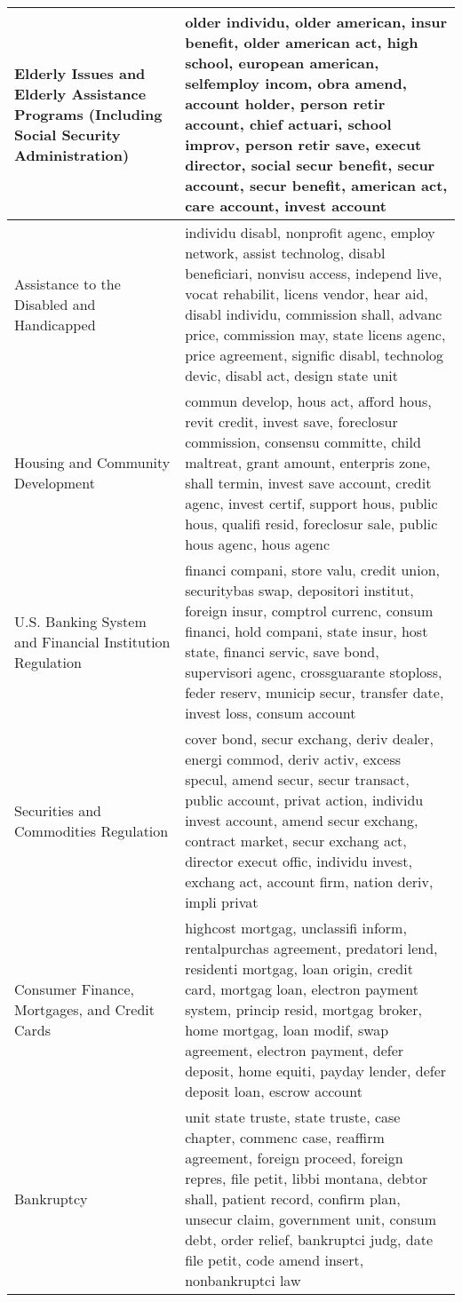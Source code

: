 \begin{longtable}{p{}p{}}
   \hline
Elderly Issues and Elderly Assistance Programs (Including Social Security
Administration) & older individu, older american, insur benefit, older american act, high school, european american, selfemploy incom, obra amend, account holder, person retir account, chief actuari, school improv, person retir save, execut director, social secur benefit, secur account, secur benefit, american act, care account, invest account \\ 
   \hline
Assistance to the Disabled and Handicapped & individu disabl, nonprofit agenc, employ network, assist technolog, disabl beneficiari, nonvisu access, independ live, vocat rehabilit, licens vendor, hear aid, disabl individu, commission shall, advanc price, commission may, state licens agenc, price agreement, signific disabl, technolog devic, disabl act, design state unit \\ 
   \hline
Housing and Community Development & commun develop, hous act, afford hous, revit credit, invest save, foreclosur commission, consensu committe, child maltreat, grant amount, enterpris zone, shall termin, invest save account, credit agenc, invest certif, support hous, public hous, qualifi resid, foreclosur sale, public hous agenc, hous agenc \\ 
   \hline
U.S. Banking System and Financial Institution Regulation & financi compani, store valu, credit union, securitybas swap, depositori institut, foreign insur, comptrol currenc, consum financi, hold compani, state insur, host state, financi servic, save bond, supervisori agenc, crossguarante stoploss, feder reserv, municip secur, transfer date, invest loss, consum account \\ 
   \hline
Securities and Commodities Regulation & cover bond, secur exchang, deriv dealer, energi commod, deriv activ, excess specul, amend secur, secur transact, public account, privat action, individu invest account, amend secur exchang, contract market, secur exchang act, director execut offic, individu invest, exchang act, account firm, nation deriv, impli privat \\ 
   \hline
Consumer Finance, Mortgages, and Credit Cards & highcost mortgag, unclassifi inform, rentalpurchas agreement, predatori lend, residenti mortgag, loan origin, credit card, mortgag loan, electron payment system, princip resid, mortgag broker, home mortgag, loan modif, swap agreement, electron payment, defer deposit, home equiti, payday lender, defer deposit loan, escrow account \\ 
   \hline
Bankruptcy & unit state truste, state truste, case chapter, commenc case, reaffirm agreement, foreign proceed, foreign repres, file petit, libbi montana, debtor shall, patient record, confirm plan, unsecur claim, government unit, consum debt, order relief, bankruptci judg, date file petit, code amend insert, nonbankruptci law \\ 

\end{longtable}
